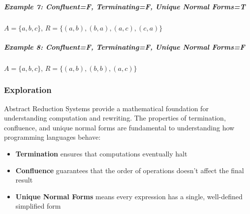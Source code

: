 \documentclass{article}
\theoremstyle{theorem}
\theoremstyle{definition}
\theoremstyle{remark}
\begin{document}
    \subparagraph{Example 7: Confluent=F, Terminating=F, Unique Normal Forms=T}
    $A = \{a,b,c\}$, $R = \{(a,b),(b,a),(a,c),(c,a)\}$
    \begin{center}
    \end{center}

    \subparagraph{Example 8: Confluent=F, Terminating=F, Unique Normal Forms=F}
    $A = \{a,b,c\}$, $R = \{(a,b),(b,b),(a,c)\}$
    \begin{center}
    \end{center}

    \subsubsection{Exploration}
    Abstract Reduction Systems provide a mathematical foundation for understanding computation and rewriting. The properties of termination, confluence, and unique normal forms are fundamental to understanding how programming languages behave:
    
    \begin{itemize}
    \item \textbf{Termination} ensures that computations eventually halt
    \item \textbf{Confluence} guarantees that the order of operations doesn't affect the final result
    \item \textbf{Unique Normal Forms} means every expression has a single, well-defined simplified form
    \end{itemize}
    
\end{document}
